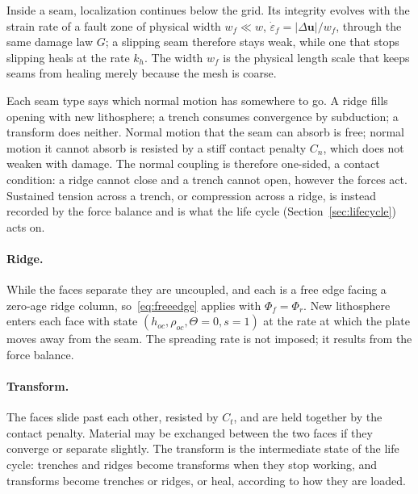 \documentclass[11pt]{article}
\newcommand{\vect}[1]{\mathbf{#1}}
\newcommand{\edot}{\dot{\varepsilon}}
\begin{document}
Inside a seam, localization continues below the grid. Its integrity evolves with the strain rate of a fault zone of physical width $w_f\ll w$, $\edot_f=|\Delta\vect u|/w_f$, through the same damage law $G$; a slipping seam therefore stays weak, while one that stops slipping heals at the rate $k_h$. The width $w_f$ is the physical length scale that keeps seams from healing merely because the mesh is coarse.

Each seam type says which normal motion has somewhere to go. A ridge fills opening with new lithosphere; a trench consumes convergence by subduction; a transform does neither. Normal motion that the seam can absorb is free; normal motion it cannot absorb is resisted by a stiff contact penalty $C_n$, which does not weaken with damage. The normal coupling is therefore one-sided, a contact condition: a ridge cannot close and a trench cannot open, however the forces act. Sustained tension across a trench, or compression across a ridge, is instead recorded by the force balance and is what the life cycle (Section~\ref{sec:lifecycle}) acts on.

\paragraph{Ridge.} While the faces separate they are uncoupled, and each is a free edge facing a zero-age ridge column, so~\eqref{eq:freeedge} applies with $\Phi_f=\Phi_r$. New lithosphere enters each face with state $(h_{oc},\rho_{oc},\Theta=0,s=1)$ at the rate at which the plate moves away from the seam. The spreading rate is not imposed; it results from the force balance.

\paragraph{Transform.} The faces slide past each other, resisted by $C_t$, and are held together by the contact penalty. Material may be exchanged between the two faces if they converge or separate slightly. The transform is the intermediate state of the life cycle: trenches and ridges become transforms when they stop working, and transforms become trenches or ridges, or heal, according to how they are loaded.
\end{document}
